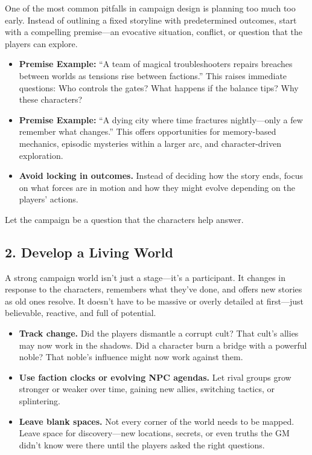 One of the most common pitfalls in campaign design is planning too much too early. Instead of outlining a fixed storyline with predetermined outcomes, start with a compelling premise—an evocative situation, conflict, or question that the players can explore.

\begin{itemize}
    \item \textbf{Premise Example:} “A team of magical troubleshooters repairs breaches between worlds as tensions rise between factions.”  
    This raises immediate questions: Who controls the gates? What happens if the balance tips? Why these characters?

    \item \textbf{Premise Example:} “A dying city where time fractures nightly—only a few remember what changes.”  
    This offers opportunities for memory-based mechanics, episodic mysteries within a larger arc, and character-driven exploration.

    \item \textbf{Avoid locking in outcomes.} Instead of deciding how the story ends, focus on what forces are in motion and how they might evolve depending on the players’ actions.
\end{itemize}

Let the campaign be a question that the characters help answer.

\subsection*{2. Develop a Living World}

A strong campaign world isn’t just a stage—it’s a participant. It changes in response to the characters, remembers what they’ve done, and offers new stories as old ones resolve. It doesn’t have to be massive or overly detailed at first—just believable, reactive, and full of potential.

\begin{itemize}
    \item \textbf{Track change.} Did the players dismantle a corrupt cult? That cult’s allies may now work in the shadows. Did a character burn a bridge with a powerful noble? That noble’s influence might now work against them.
    
    \item \textbf{Use faction clocks or evolving NPC agendas.} Let rival groups grow stronger or weaker over time, gaining new allies, switching tactics, or splintering.

    \item \textbf{Leave blank spaces.} Not every corner of the world needs to be mapped. Leave space for discovery—new locations, secrets, or even truths the GM didn’t know were there until the players asked the right questions.
\end{itemize}

